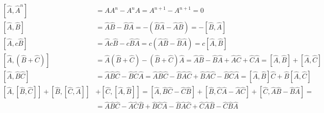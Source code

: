 \documentclass[10pt]{article} %
\begin{document}
\begin{align*}
  \left[\hat{A},\hat{A}^n\right] &= AA^n - A^nA = A^{n+1} - A^{n+1} = 0\\
  \left[\hat{A},\hat{B}\right] &= \hat{A}\hat{B} - \hat{B}\hat{A}
  = -\left(\hat{B}\hat{A} - \hat{A}\hat{B}\right) = -\left[\hat{B},\hat{A}\right]\\
  \left[\hat{A},c\hat{B}\right] &= \hat{A}c\hat{B} - c\hat{B}\hat{A}
  = c\left(\hat{A}\hat{B} - \hat{B}\hat{A}\right) = c\left[\hat{A},\hat{B}\right]\\
  \left[\hat{A},\left(\hat{B}+\hat{C}\right)\right] &= \hat{A}\left(\hat{B} + \hat{C}\right)
  - \left(\hat{B} + \hat{C}\right)\hat{A} = \hat{A}\hat{B} - \hat{B}\hat{A}
  + \hat{A}\hat{C} + \hat{C}\hat{A} = \left[\hat{A},\hat{B}\right] + \left[\hat{A},\hat{C}\right]\\
  \left[\hat{A},\hat{B}\hat{C}\right] &= \hat{A}\hat{B}\hat{C} - \hat{B}\hat{C}\hat{A}
  = \hat{A}\hat{B}\hat{C} - \hat{B}\hat{A}\hat{C} + \hat{B}\hat{A}\hat{C} - \hat{B}\hat{C}\hat{A}
  = \left[\hat{A},\hat{B}\right]\hat{C} + \hat{B}\left[\hat{A},\hat{C}\right]\\
  \left[\hat{A},\left[\hat{B},\hat{C}\right]\right]
  + \left[\hat{B},\left[\hat{C},\hat{A}\right]\right]
  &+ \left[\hat{C},\left[\hat{A},\hat{B}\right]\right] =
  \left[\hat{A},\hat{B}\hat{C} - \hat{C}\hat{B}\right]
  + \left[\hat{B},\hat{C}\hat{A} - \hat{A}\hat{C}\right]
  + \left[\hat{C},\hat{A}\hat{B} - \hat{B}\hat{A}\right] = \\
  &= \hat{A}\hat{B}\hat{C} - \hat{A}\hat{C}\hat{B}
  + \hat{B}\hat{C}\hat{A} - \hat{B}\hat{A}\hat{C}
  + \hat{C}\hat{A}\hat{B} - \hat{C}\hat{B}\hat{A}\\
\end{align*}
\end{document}
